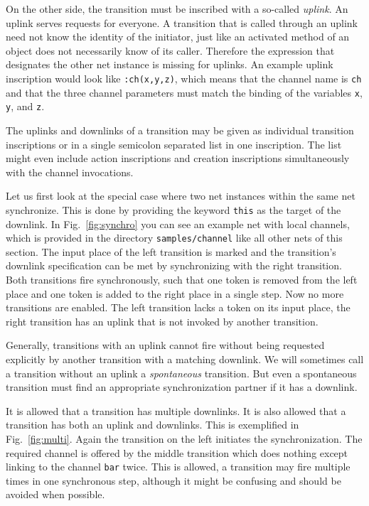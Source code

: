 On the other side, the transition must be inscribed with a
so-called \emph{uplink}. An uplink serves requests for everyone.
A transition that is called through an uplink need not know the
identity of the initiator, just like an activated method of an object
does not necessarily know of its caller.
Therefore the expression that designates the other net instance
is missing for uplinks. An example uplink inscription
would look like \texttt{:ch(x,y,z)}, which means that
the channel name is \texttt{ch} and that the three channel
parameters must match the binding of the variables \texttt{x},
\texttt{y}, and \texttt{z}.

The uplinks and downlinks of a transition may be
given as individual transition inscriptions or in a single
semicolon separated list in one inscription. The list might
even include action inscriptions and creation inscriptions
simultaneously with the channel invocations.

Let us first look at the special case where two net instances
within the same net synchronize. This is done by providing
the keyword \texttt{this} as the target of the downlink.
In Fig.~\ref{fig:synchro} you can see an example net with local
channels, which is provided in the directory \texttt{samples/channel}
like all other nets of this section.
The input place of the left transition
is marked and the transition's downlink specification can be
met by synchronizing with the right transition. Both transitions
fire synchronously, such that one token is removed from
the left place and one token is added to the right place
in a single step.
Now no more transitions are enabled. The left transition
lacks a token on its input place, the right
transition has an uplink that is not invoked by another transition.

Generally, transitions with an uplink cannot fire without being
requested explicitly by another transition with a matching downlink.
We will sometimes call a transition without an uplink
a \emph{spontaneous} transition. But even a spontaneous transition
must find an appropriate synchronization partner if it has a downlink.

It is allowed that a transition has multiple downlinks. It is also
allowed that a transition has both an uplink and downlinks. This is
exemplified in Fig.~\ref{fig:multi}. Again the transition on the left
initiates the synchronization. The required channel is offered by the
middle transition which does nothing except linking to the channel
\texttt{bar} twice. This is allowed, a transition may fire multiple
times in one synchronous step, although it might be confusing and
should be avoided when possible.

